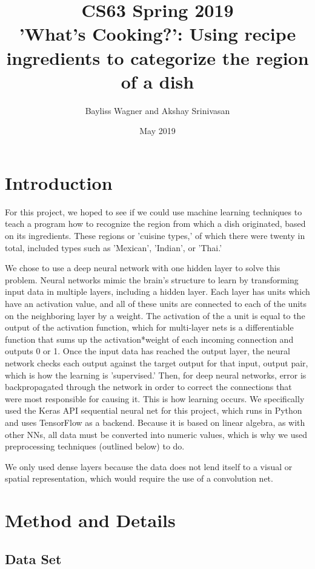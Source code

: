 \documentclass[11pt]{article}
\title{CS63 Spring 2019\\'What's Cooking?': Using recipe ingredients to categorize the region of a dish}
\author{Bayliss Wagner and Akshay Srinivasan}
\date{May 2019}
\begin{document}
\maketitle

\section{Introduction}

For this project, we hoped to see if we could use machine learning techniques to teach a program how to recognize the region from which a dish originated, based on its ingredients. These regions or 'cuisine types,' of which there were twenty in total, included types such as 'Mexican', 'Indian', or 'Thai.' 

We chose to use a deep neural network with one hidden layer to solve this problem. Neural networks mimic the brain's structure to learn by transforming input data in multiple layers, including a hidden layer. Each layer has units which have an activation value, and all of these units are connected to each of the units on the neighboring layer by a weight. The activation of the a unit is equal to the output of the activation function, which for multi-layer nets is a differentiable function that sums up the activation*weight of each incoming connection and outputs 0 or 1.  Once the input data has reached the output layer, the neural network checks each output against the target output for that input, output pair, which is how the learning is 'supervised.' Then, for deep neural networks, error is backpropagated through the network in order to correct the connections that were most responsible for causing it. This is how learning occurs. We specifically used the Keras API sequential neural net for this project, which runs in Python and uses TensorFlow as a backend. Because it is based on linear algebra, as with other NNs, all data must be converted into numeric values, which is why we used preprocessing techniques (outlined below) to do.

We only used dense layers because the data does not lend itself to a visual or spatial representation, which would require the use of a convolution net. 

\section{Method and Details}
\subsection{Data Set}
\end{document}
